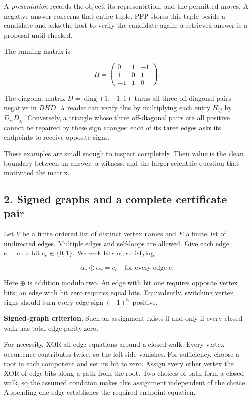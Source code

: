 \documentclass[
  11pt,
]{article}
\begin{document}
A \emph{presentation} records the object, its representation, and the
permitted moves. A negative answer concerns that entire tuple. PFP
stores this tuple beside a candidate and asks the host to verify the
candidate again; a retrieved answer is a proposal until checked.

The running matrix is

\[
H=\begin{pmatrix}0&1&-1\\1&0&1\\-1&1&0\end{pmatrix}.
\]

The diagonal matrix \(D=\operatorname{diag}(1,-1,1)\) turns all three
off-diagonal pairs negative in \(DHD\). A reader can verify this by
multiplying each entry \(H_{ij}\) by \(D_{ii}D_{jj}\). Conversely, a
triangle whose three off-diagonal pairs are all positive cannot be
repaired by these sign changes: each of its three edges asks its
endpoints to receive opposite signs.

These examples are small enough to inspect completely. Their value is
the clean boundary between an answer, a witness, and the larger
scientific question that motivated the matrix.

\hypertarget{signed-graphs-and-a-complete-certificate-pair}{%
\subsection{2. Signed graphs and a complete certificate
pair}\label{signed-graphs-and-a-complete-certificate-pair}}

Let \(V\) be a finite ordered list of distinct vertex names and \(E\) a
finite list of undirected edges. Multiple edges and self-loops are
allowed. Give each edge \(e=uv\) a bit \(c_e\in\{0,1\}\). We seek bits
\(\alpha_v\) satisfying

\[
\alpha_u\mathbin{\oplus}\alpha_v=c_e
\quad\text{for every edge }e.
\]

Here \(\oplus\) is addition modulo two. An edge with bit one requires
opposite vertex bits; an edge with bit zero requires equal bits.
Equivalently, switching vertex signs should turn every edge sign
\((-1)^{c_e}\) positive.

\textbf{Signed-graph criterion.} Such an assignment exists if and only
if every closed walk has total edge parity zero.

For necessity, XOR all edge equations around a closed walk. Every vertex
occurrence contributes twice, so the left side vanishes. For
sufficiency, choose a root in each component and set its bit to zero.
Assign every other vertex the XOR of edge bits along a path from the
root. Two choices of path form a closed walk, so the assumed condition
makes this assignment independent of the choice. Appending one edge
establishes the required endpoint equation.
\end{document}
